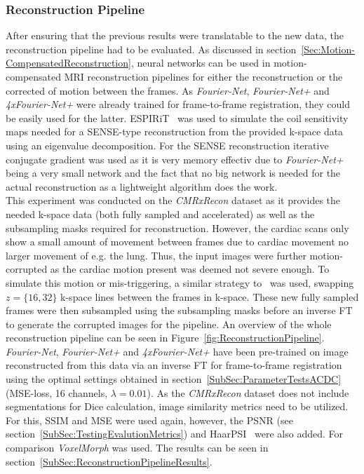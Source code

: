 \documentclass[english,version-2022-01]{uzl-thesis} %
\begin{document}
\subsubsection{Reconstruction Pipeline} \label{SubSubSec:ReconstructionPipeline}
After ensuring that the previous results were translatable to the new data, the reconstruction pipeline had to be evaluated. As discussed in section~\ref{Sec:Motion-CompensatedReconstruction}, neural networks can be used in motion-compensated MRI reconstruction pipelines for either the reconstruction or the corrected of motion between the frames. As \emph{Fourier-Net}, \emph{Fourier-Net+} and \emph{4xFourier-Net+} were already trained for frame-to-frame registration, they could be easily used for the latter. ESPIRiT~\cite{ESPIRiT} was used to simulate the coil sensitivity maps needed for a SENSE-type reconstruction from the provided k-space data using an eigenvalue decomposition. For the SENSE reconstruction iterative conjugate gradient was used as it is very memory effectiv due to \emph{Fourier-Net+} being a very small network and the fact that no big network is needed for the actual reconstruction as a lightweight algorithm does the work. \\ 
This experiment was conducted on the \emph{CMRxRecon} dataset as it provides the needed k-space data (both fully sampled and accelerated) as well as the subsampling masks required for reconstruction. However, the cardiac scans only show a small amount of movement between frames due to cardiac movement no larger movement of e.g. the lung. Thus, the input images were further motion-corrupted as the cardiac motion present was deemed not severe enough. To simulate this motion or mis-triggering, a similar strategy to~\cite{Oksuz2020} was used, swapping $z=\{16,32\}$ k-space lines between the frames in k-space. These new fully sampled frames were then subsampled using the subsampling masks before an inverse FT to generate the corrupted images for the pipeline. An overview of the whole reconstruction pipeline  can be seen in Figure~\ref{fig:ReconstructionPipeline}.\\
\emph{Fourier-Net}, \emph{Fourier-Net+} and \emph{4xFourier-Net+} have been pre-trained on image reconstructed from this data via an inverse FT for frame-to-frame registration using the optimal settings obtained in section~\ref{SubSec:ParameterTestsACDC} (MSE-loss, 16 channels, $\lambda=0.01$). As the \emph{CMRxRecon} dataset does not include segmentations for Dice calculation, image similarity metrics need to be utilized. For this, SSIM and MSE were used again, however, the PSNR (see section~\ref{SubSec:TestingEvalutionMetrics}) and HaarPSI~\cite{HaarPSI} were also added. For comparison \emph{VoxelMorph} was used. The results can be seen in section~\ref{SubSec:ReconstructionPipelineResults}.
\end{document}
